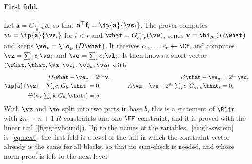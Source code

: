 \paragraph{First fold.}
Let $\bar{\mathbf a}=G_{b_0,m}^\top\mathbf a$, so that $\mathbf a^\top\mathbf f_i=\ip{\bar{\mathbf a}}{\vs_i}$. The prover computes $w_i=\ip{\bar{\mathbf a}}{\vs_i}$ for $i<r$ and $\what=G^{-1}_{b_1,r}(\vw)$, sends $\mathbf v=\hi_{\varrho_u}(D\what)$ and keeps $\ve_v=\lo_{\varrho_u}(D\what)$. It receives $c_1,\dots,c_r\leftarrow\Ch$ and computes $\vz=\sum_ic_i\vs_i$ and $\ve=\sum_ic_i\vl_i$. It then knows a short vector $(\what,\that,\vz,\ve_v,\ve_u,\ve)$ with
\begin{equation}\label{eq:gh-system}
\begin{aligned}
D\what-\ve_v&=2^{\varrho_u}\mathbf v, &\qquad B\that-\ve_u&=2^{\varrho_u}\vu,\\
\ip{\bar{\mathbf a}}{\vz}-\textstyle\sum_ic_i\,G_{b_1}\what_i&=0, &\qquad A\vz-\ve-2^{\varrho_t}\textstyle\sum_ic_i\,G_{b_1,n}\that_i&=0,\\
\Theta\bigl(\psi_x\textstyle\sum_ib_i\,G_{b_1}\what_i\bigr)&=\hat y .
\end{aligned}
\end{equation}
With $\vz$ and $\ve$ split into two parts in base $b$, this is a statement of $\Rlin$ with $2n_1+n+1$ $R$-constraints and one $\FF$-constraint, and it is proved with the linear tail (\cref{fig:greyhound}). Up to the names of the variables,~\eqref{eq:gh-system} is~\eqref{eq:next}: the first fold is a level of the tail in which the constraint vector already is the same for all blocks, so that no sum-check is needed, and whose norm proof is left to the next level.

